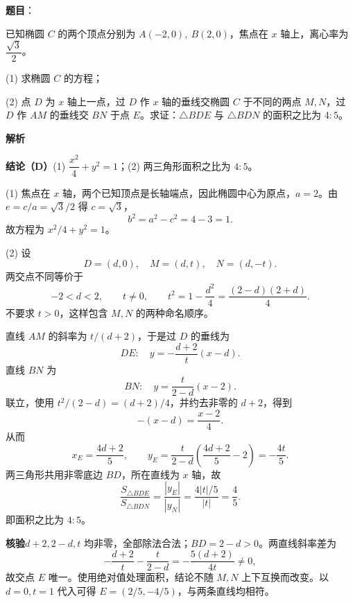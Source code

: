\begin{answer}

\textbf{题目}：

已知椭圆 $C$ 的两个顶点分别为 $A(-2,0),\ B(2,0)$，焦点在 $x$ 轴上，离心率为 $\dfrac{\sqrt3}{2}$。

(1)   求椭圆 $C$ 的方程；

(2)   点 $D$ 为 $x$ 轴上一点，过 $D$ 作 $x$ 轴的垂线交椭圆 $C$ 于不同的两点 $M,N$，过 $D$ 作 $AM$ 的垂线交 $BN$ 于点 $E$。求证：$\triangle BDE$ 与 $\triangle BDN$ 的面积之比为 $4:5$。

\textbf{解析}

\textbf{结论（D）}(1) $\dfrac{x^2}{4}+y^2=1$；(2) 两三角形面积之比为 $4:5$。

(1) 焦点在 $x$ 轴，两个已知顶点是长轴端点，因此椭圆中心为原点，$a=2$。由 $e=c/a=\sqrt3/2$ 得 $c=\sqrt3$，
\nopagebreak[4]
\[
b^2=a^2-c^2=4-3=1.
\]
故方程为 $x^2/4+y^2=1$。

(2) 设
\nopagebreak[4]
\[
D=(d,0),\quad M=(d,t),\quad N=(d,-t).
\]
两交点不同等价于
\nopagebreak[4]
\[
-2<d<2,\qquad t\ne0,\qquad
t^2=1-\frac{d^2}{4}=\frac{(2-d)(2+d)}4.
\]
不要求 $t>0$，这样包含 $M,N$ 的两种命名顺序。

直线 $AM$ 的斜率为 $t/(d+2)$，于是过 $D$ 的垂线为
\nopagebreak[4]
\[
DE:\quad y=-\frac{d+2}{t}(x-d).
\]
直线 $BN$ 为
\nopagebreak[4]
\[
BN:\quad y=\frac{t}{2-d}(x-2).
\]
联立，使用 $t^2/(2-d)=(d+2)/4$，并约去非零的 $d+2$，得到
\nopagebreak[4]
\[
-(x-d)=\frac{x-2}{4}.
\]
从而
\nopagebreak[4]
\[
x_E=\frac{4d+2}{5},\qquad
y_E=\frac{t}{2-d}\left(\frac{4d+2}{5}-2\right)=-\frac{4t}{5}.
\]
两三角形共用非零底边 $BD$，所在直线为 $x$ 轴，故
\nopagebreak[4]
\[
\frac{S_{\triangle BDE}}{S_{\triangle BDN}}
=\frac{|y_E|}{|y_N|}
=\frac{4|t|/5}{|t|}=\frac45.
\]
即面积之比为 $4:5$。

\textbf{核验}$d+2,2-d,t$ 均非零，全部除法合法；$BD=2-d>0$。两直线斜率差为
\nopagebreak[4]
\[
-\frac{d+2}{t}-\frac{t}{2-d}
=-\frac{5(d+2)}{4t}\ne0,
\]
故交点 $E$ 唯一。使用绝对值处理面积，结论不随 $M,N$ 上下互换而改变。以 $d=0,t=1$ 代入可得 $E=(2/5,-4/5)$，与两条直线均相符。



\end{answer}
